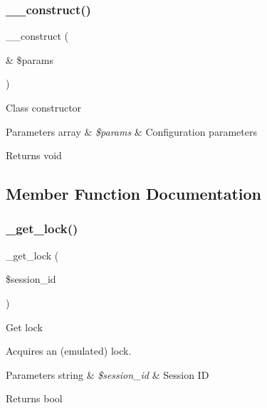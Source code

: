 \subsubsection{\texorpdfstring{\+\_\+\+\_\+construct()}{\_\_construct()}}
{\footnotesize\ttfamily \+\_\+\+\_\+construct (\begin{DoxyParamCaption}\item[{\&}]{\$params }\end{DoxyParamCaption})}

Class constructor


\begin{DoxyParams}[1]{Parameters}
array & {\em \$params} & Configuration parameters \\
\hline
\end{DoxyParams}
\begin{DoxyReturn}{Returns}
void 
\end{DoxyReturn}


\subsection{Member Function Documentation}
\mbox{\label{class_c_i___session__redis__driver_a2c49c8e23be3e2aca96a9d20de18ffc2}} 
\subsubsection{\texorpdfstring{\+\_\+get\+\_\+lock()}{\_get\_lock()}}
{\footnotesize\ttfamily \+\_\+get\+\_\+lock (\begin{DoxyParamCaption}\item[{}]{\$session\+\_\+id }\end{DoxyParamCaption})\hspace{0.3cm}{\ttfamily [protected]}}

Get lock

Acquires an (emulated) lock.


\begin{DoxyParams}[1]{Parameters}
string & {\em \$session\+\_\+id} & Session ID \\
\hline
\end{DoxyParams}
\begin{DoxyReturn}{Returns}
bool 
\end{DoxyReturn}
\mbox{\label{class_c_i___session__redis__driver_a0265e356e6cf1eaba229663c1664c37d}} 
